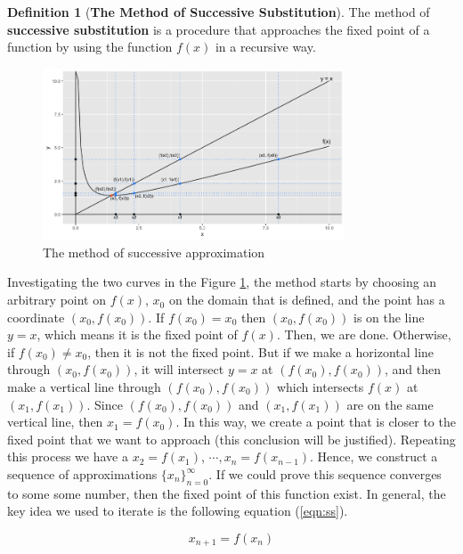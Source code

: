 \documentclass{article}
\theoremstyle{definition}
\newtheorem{definition}{Definition}[section]
\theoremstyle{remark}
\begin{document}
\begin{definition}[\textbf{The Method of Successive Substitution}]\label{def:MethodSS}
The method of \textbf{successive substitution} is a procedure that approaches the fixed point of a function by using the function $f(x)$ in a recursive way. 
\begin{figure}[H]
    \centering
    \includegraphics[width=0.8\textwidth]{Successive Approximation Visualization.png}
    \caption{\label{vis:V1}The method of successive approximation}
\end{figure}
Investigating the two curves in the Figure \ref{vis:V1}, the method starts by choosing an arbitrary point on $f(x)$, $x_{0}$ on the domain that is defined, and the point has a coordinate $(x_0, f(x_0))$. If $f(x_0) = x_0$ then $(x_0, f(x_0))$ is on the line $y = x$, which means it is the fixed point of $f(x)$. Then, we are done. Otherwise, if $f(x_0) \neq x_0$, then it is not the fixed point. But if we make a horizontal line through $(x_0,f(x_0))$, it will intersect $y = x$ at $(f(x_0),f(x_0))$, and then make a vertical line through $(f(x_0),f(x_0))$ which intersects $f(x)$ at $(x_1,f(x_1))$. Since $(f(x_0),f(x_0))$ and $(x_1,f(x_1))$ are on the same vertical line, then $x_1 = f(x_0)$. In this way, we create a point that is closer to the fixed point that we want to approach (this conclusion will be justified). Repeating this process we have a $x_2 = f(x_1)$, $\cdots, x_n = f(x_{n-1})$. Hence, we construct a sequence of approximations $\{x_n\}_{n=0}^{\infty}$. If we could prove this sequence converges to some some number, then the fixed point of this function exist. In general, the key idea we used to iterate is the following equation (\ref{eqn:ss}).

\begin{equation} \label{eqn:ss}
    x_{n+1} = f(x_{n})
\end{equation}

\end{definition}
\end{document}
